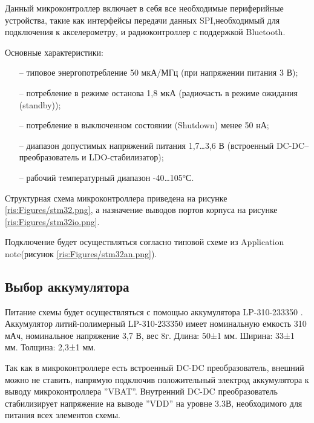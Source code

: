 \begin{sloppypar}
Данный микроконтроллер включает в себя все необходимые периферийные устройства, такие как интерфейсы передачи данных SPI,необходимый для подключения к акселерометру, и радиоконтроллер с поддержкой Bluetooth.

Основные характеристики:
\begin{onehalfspace}
	\begin{itemize}
		\item[--] типовое энергопотребление 50 мкА/МГц (при напряжении питания 3 В);
		\item[--] потребление в режиме останова 1,8 мкА (радиочасть в режиме ожидания (standby));
		\item[--] потребление в выключенном состоянии (Shutdown) менее 50 нА;
		\item[--] диапазон допустимых напряжений питания 1,7…3,6 В (встроенный DC-DC–преобразователь и LDO-стабилизатор);
		\item[--] рабочий температурный диапазон -40…105°С.
	\end{itemize}
\end{onehalfspace}


Структурная схема микроконтроллера приведена на рисунке \ref{ris:Figures/stm32.png}, а назначение выводов портов корпуса на рисунке \ref{ris:Figures/stm32io.png}.





Подключение будет осуществляться согласно типовой схеме из Application note\cite {STM_an}(рисунок \ref{ris:Figures/stm32an.png}).


\subsection{Выбор аккумулятора}
Питание схемы будет осуществляться с помощью аккумулятора LP-310-233350 \cite {li-pol}.
Аккумулятор литий-полимерный LP-310-233350 имеет номинальную емкость 310 мАч, номинальное напряжение 3,7 В, вес 8г. Длина: 50±1 мм. Ширина: 33±1 мм. Толщина: 2,3±1 мм. 

Так как в микроконтроллере есть встроенный DC-DC преобразователь, внешний можно не ставить, напрямую подключив положительный электрод аккумулятора к выводу микроконтроллера ''VBAT''. Внутренний DC-DC преобразователь стабилизирует напряжение на выводе ''VDD'' на уровне 3.3В, необходимого для питания всех элементов схемы.


\end{sloppypar}
